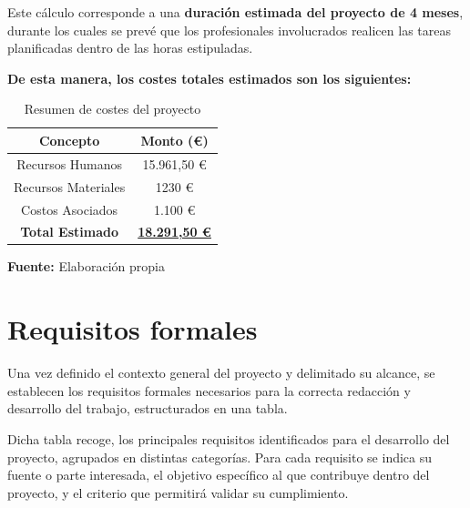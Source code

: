 \documentclass[a4paper, 11pt]{article}
\begin{document}
Este cálculo corresponde a una \textbf{duración estimada del proyecto de 4 meses}, durante los cuales se prevé que los profesionales involucrados realicen las tareas planificadas dentro de las horas estipuladas.  

\textbf{De esta manera, los costes totales estimados son los siguientes:}  

\begin{table}[H]
\caption{Resumen de costes del proyecto}
\centering
\renewcommand{\arraystretch}{1.5}
\begin{tabular}{|c|c|}
\hline
\textbf{Concepto} & \textbf{Monto (€)} \\ \hline
Recursos Humanos & 15.961,50 € \\ \hline
Recursos Materiales & 1230 € \\ \hline
Costos Asociados & 1.100 € \\ \hline
\textbf{Total Estimado} & \underline{\textbf{18.291,50 €}} \\ \hline
\end{tabular}
\begin{flushleft}\centering
    \footnotesize \textbf{Fuente:} Elaboración propia
\end{flushleft}   
\label{tab:resumen_costes}
\end{table}

\clearpage
\thispagestyle{nohead}


\section{Requisitos formales}

Una vez definido el contexto general del proyecto y delimitado su alcance, se establecen los requisitos formales necesarios para la correcta redacción y desarrollo del trabajo, estructurados en una tabla.

Dicha tabla recoge, los principales requisitos identificados para el desarrollo del proyecto, agrupados en distintas categorías. Para cada requisito se indica su fuente 
o parte interesada, el objetivo específico al que contribuye dentro del proyecto, y el criterio que permitirá validar su cumplimiento.
\end{document}

